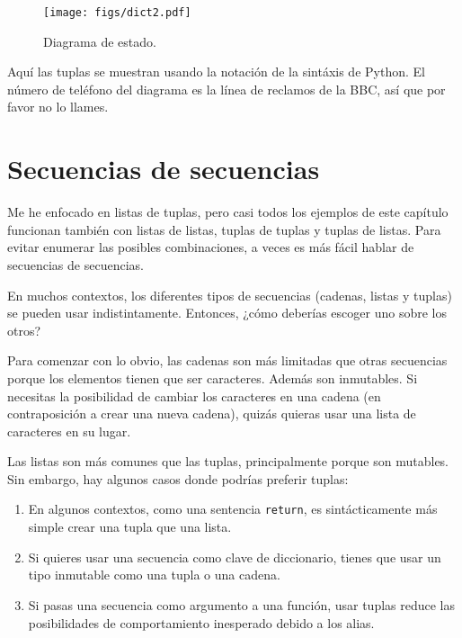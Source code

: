 \documentclass[10pt]{book}
\begin{document}
\begin{figure}
\centerline
{\texttt{[image: figs/dict2.pdf]}}
\caption{Diagrama de estado.}
\label{fig.dict2}
\end{figure}

Aquí las tuplas se muestran usando la notación de la sintáxis de Python.
El número de teléfono del diagrama es la línea de reclamos
de la BBC, así que por favor no lo llames.


\section{Secuencias de secuencias}

Me he enfocado en listas de tuplas, pero casi todos los ejemplos de
este capítulo funcionan también con listas de listas, tuplas de tuplas y
tuplas de listas.  Para evitar enumerar las posibles combinaciones, a veces
es más fácil hablar de secuencias de secuencias.

En muchos contextos, los diferentes tipos de secuencias (cadenas, listas y
tuplas) se pueden usar indistintamente.  Entonces, ¿cómo deberías escoger uno
sobre los otros?

Para comenzar con lo obvio, las cadenas son más limitadas que otras
secuencias porque los elementos tienen que ser caracteres.  Además
son inmutables.  Si necesitas la posibilidad de cambiar los caracteres
en una cadena (en contraposición a crear una nueva cadena), quizás quieras
usar una lista de caracteres en su lugar.

Las listas son más comunes que las tuplas, principalmente porque son mutables.
Sin embargo, hay algunos casos donde podrías preferir tuplas:

\begin{enumerate}

\item En algunos contextos, como una sentencia {\tt return}, es
sintácticamente más simple crear una tupla que una lista.

\item Si quieres usar una secuencia como clave de diccionario,
tienes que usar un tipo inmutable como una tupla o una cadena.

\item Si pasas una secuencia como argumento a una función,
usar tuplas reduce las posibilidades de comportamiento inesperado
debido a los alias.

\end{enumerate}
\end{document}
